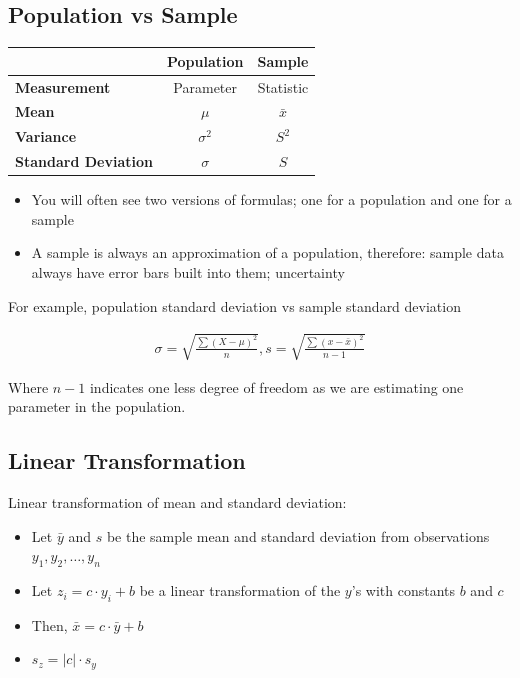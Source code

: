 \documentclass{article}
\begin{document}
\subsection{Population vs Sample}

\begin{tabular}{|l|c|c|}
\hline
 & \textbf{Population} & \textbf{Sample} \\
\hline
\textbf{Measurement} & Parameter & Statistic \\
\textbf{Mean} & $\mu$ & $\bar{x}$ \\
\textbf{Variance} & $\sigma^2$ & $S^2$ \\
\textbf{Standard Deviation} & $\sigma$ & $S$ \\
\hline
\end{tabular}

\begin{itemize}
    \item You will often see two versions of formulas; one for a population and one for a sample
    \item A sample is always an approximation of a population, therefore: sample data always have error bars built into them; uncertainty
\end{itemize}

For example, population standard deviation vs sample standard deviation

\begin{align*}
    \sigma=\sqrt{\frac{\sum{(X-\mu)}^2}{n}}, s= \sqrt{\frac{\sum{(x-\bar{x})}^2}{n-1}}
\end{align*}

Where $n-1$ indicates one less degree of freedom as we are estimating one parameter in the population.

\subsection{Linear Transformation}

Linear transformation of mean and standard deviation:

\begin{itemize}
    \item Let $\bar{y}$ and $s$ be the sample mean and standard deviation from observations $y_1,y_2,\dots,y_n$ 
    \item Let $z_i=c \cdot y_i + b$ be a linear transformation of the $y$'s with constants $b$ and $c$
    \item Then, $\bar{x}=c \cdot \bar{y} + b$
    \item $s_z= |c| \cdot s_y$
\end{itemize}
\end{document}
